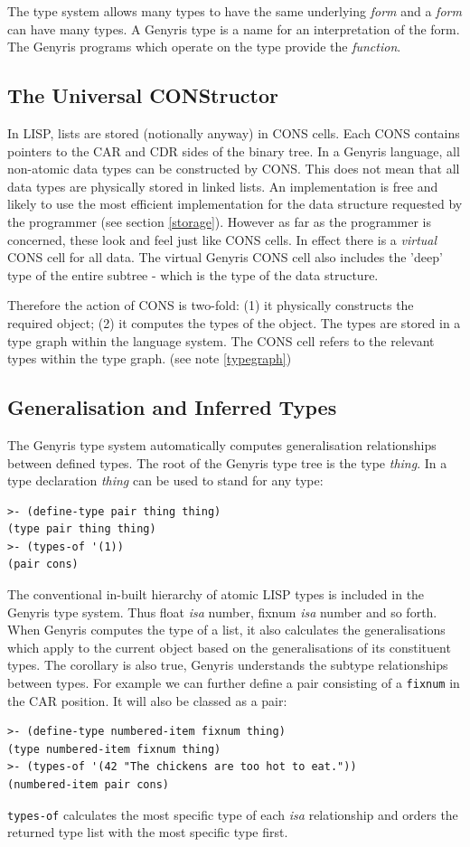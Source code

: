 \documentclass[a4paper,12pt,dvips]{article}
\begin{document}
The type system allows many types to have the same underlying \emph{form} and a \emph{form} can have many types. A Genyris type is a name for an interpretation of the form. The Genyris programs which operate on the type provide the \emph{function}. 

\subsection{The Universal CONStructor}
In LISP, lists are stored (notionally anyway) in CONS cells. Each CONS contains pointers to the CAR and CDR sides of the binary tree. In a Genyris language, all non-atomic data types can be constructed by CONS. This does not mean that all data types are physically stored in linked lists. An implementation is free and likely to use the most efficient implementation for the data structure requested by the programmer (see section \ref{storage}). However as far as the programmer is concerned, these look and feel just like CONS cells. In effect there is a \emph{virtual} CONS cell for all data. The virtual Genyris CONS cell also includes the 'deep' type of the entire subtree  - which is the type of the data structure. 

Therefore the action of CONS is two-fold: (1) it physically constructs the required object; (2) it computes the types of the object. The types are stored in a type graph within the language system. The CONS cell refers to the relevant types within the type graph. (see note \ref{typegraph})

\subsection{Generalisation and Inferred Types}
The Genyris type system automatically computes generalisation relationships between defined types. The root of the Genyris type tree is the type \emph{thing}. In a type declaration \emph{thing} can be used to stand for any type:
\begin{verbatim}
>- (define-type pair thing thing)
(type pair thing thing)
>- (types-of '(1))
(pair cons)
\end{verbatim}
The conventional in-built hierarchy of atomic LISP types is included in the Genyris type system. Thus float \emph{isa} number, fixnum \emph{isa} number and so forth. When Genyris computes the type of a list, it also calculates the generalisations which apply to the current object based on the generalisations of its constituent types. The corollary is also true, Genyris understands the subtype relationships between types. For example we can further define a pair consisting of a \texttt{fixnum} in the CAR position. It will also be classed as a pair:
\begin{verbatim}
>- (define-type numbered-item fixnum thing)
(type numbered-item fixnum thing)
>- (types-of '(42 "The chickens are too hot to eat."))
(numbered-item pair cons)
\end{verbatim}
\texttt{types-of} calculates the most specific type of each \emph{isa} relationship and orders the returned type list with the most specific type first.
\end{document}
